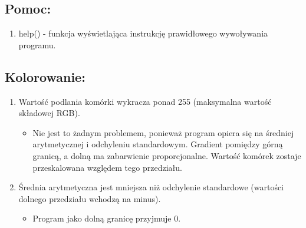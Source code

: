 \documentclass[a4paper]{article}
\begin{document}
\subsection{Pomoc:}

\begin{enumerate}
    \item help() - funkcja wyświetlająca instrukcję prawidłowego wywoływania programu.
\end{enumerate}



\subsection{Kolorowanie:}
\begin{enumerate}
    \item Wartość podlania komórki wykracza ponad 255 (maksymalna wartość składowej RGB).
          \begin{itemize}
              \item Nie jest to żadnym problemem, ponieważ program opiera się na średniej arytmetycznej i odchyleniu standardowym. Gradient pomiędzy górną granicą, a dolną ma zabarwienie proporcjonalne. Wartość komórek zostaje przeskalowana względem tego przedziału.
          \end{itemize}
    \item Średnia arytmetyczna jest mniejsza niż odchylenie standardowe (wartości dolnego 		    przedziału wchodzą na minus).
          \begin{itemize}
              \item Program jako dolną granicę przyjmuje 0.
          \end{itemize}
\end{enumerate}
\end{document}
